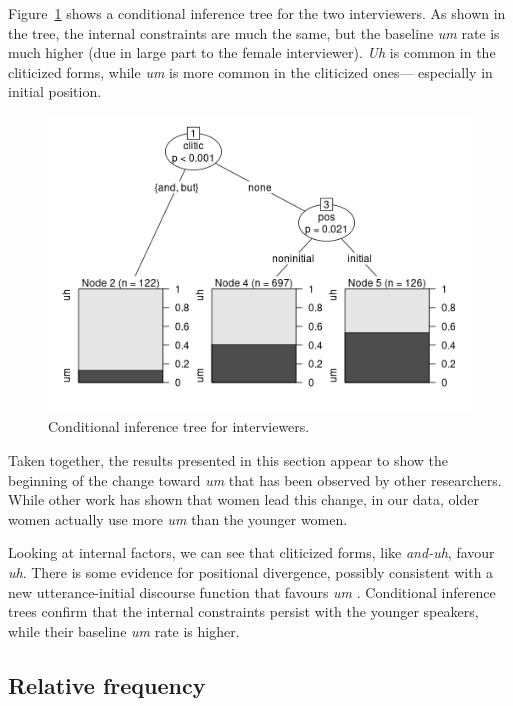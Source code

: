 \documentclass[11pt]{article}
\begin{document}
Figure~\ref{fig:interviewertree} shows a conditional inference tree for the two
interviewers.
As shown in the tree, the internal constraints are much the same, but the
baseline \emph{um} rate is much higher (due in large part to the female
interviewer).
\emph{Uh} is common in the cliticized forms, while \emph{um} is more common in
the cliticized ones---%
especially in initial position.

\begin{figure}[htpb]
    \centering
    \includegraphics[width=0.8\linewidth]{figures/ctreeinterviewers.png}
    \caption{Conditional inference tree for interviewers.}
    \label{fig:interviewertree}
\end{figure}

Taken together, the results presented in this section appear to show the
beginning of the change toward \emph{um} that has been observed by other
researchers.
While other work has shown that women lead this change, in our data, older women
actually use more \emph{um} than the younger women.

Looking at internal factors, we can see that cliticized forms, like
\emph{and-uh}, favour \emph{uh}.
There is some evidence for positional divergence, possibly consistent with a new
utterance-initial discourse function that favours \emph{um}
\parencite[cf.][, who found no turn-positional difference]{fruehwald2016}.
Conditional inference trees confirm that the internal constraints persist with
the younger speakers, while their baseline \emph{um} rate is higher.

\subsection{Relative frequency}
\end{document}
